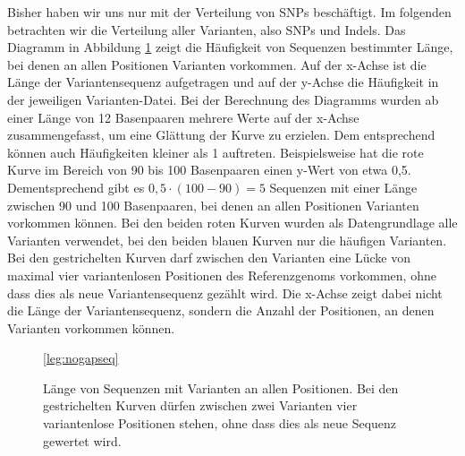 Bisher haben wir uns nur mit der Verteilung von SNPs beschäftigt. Im folgenden betrachten wir die Verteilung aller Varianten, also SNPs und Indels. Das Diagramm in Abbildung \ref{fig:stats:nogapseq} zeigt die Häufigkeit von Sequenzen bestimmter Länge, bei denen an allen Positionen Varianten vorkommen. Auf der x-Achse ist die Länge der Variantensequenz aufgetragen und auf der y-Achse die Häufigkeit in der jeweiligen Varianten-Datei. Bei der Berechnung des Diagramms wurden ab einer Länge von 12 Basenpaaren mehrere Werte auf der x-Achse zusammengefasst, um eine Glättung der Kurve zu erzielen. Dem entsprechend können auch Häufigkeiten kleiner als 1 auftreten. Beispielsweise hat die rote Kurve im Bereich von 90 bis 100 Basenpaaren einen y-Wert von etwa 0,5. Dementsprechend gibt es $0{,}5 \cdot (100 - 90) = 5$ Sequenzen mit einer Länge zwischen 90 und 100 Basenpaaren, bei denen an allen Positionen Varianten vorkommen können. Bei den beiden roten Kurven wurden als Datengrundlage alle Varianten verwendet, bei den beiden blauen Kurven nur die häufigen Varianten. Bei den gestrichelten Kurven darf zwischen den Varianten eine Lücke von maximal vier variantenlosen Positionen des Referenzgenoms vorkommen, ohne dass dies als neue Variantensequenz gezählt wird. Die x-Achse zeigt dabei nicht die Länge der Variantensequenz, sondern die Anzahl der Positionen, an denen Varianten vorkommen können.

\begin{figure}[h]
\pgfplotsset{footnotesize,width=12cm,compat=1.8}
\begin{center}
\ref*{leg:nogapseq}
\end{center}
\caption{Länge von Sequenzen mit Varianten an allen Positionen. Bei den gestrichelten Kurven dürfen zwischen zwei Varianten vier variantenlose Positionen stehen, ohne dass dies als neue Sequenz gewertet wird.}
\label{fig:stats:nogapseq}
\end{figure}

